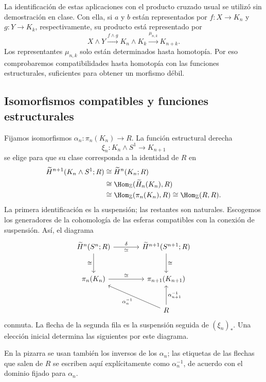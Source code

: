 La identificación de estas aplicaciones con el producto cruzado usual se utilizó sin demostración en clase. Con ella, si $a$ y $b$ están representados por $f\colon X\to K_n$ y $g\colon Y\to K_k$, respectivamente, su producto está representado por
\[
X\wedge Y\xrightarrow{f\wedge g}K_n\wedge K_k
\xrightarrow{\mu_{n,k}}K_{n+k}.
\]
Los representantes $\mu_{n,k}$ solo están determinados hasta homotopía. Por eso comprobaremos compatibilidades hasta homotopía con las funciones estructurales, suficientes para obtener un morfismo débil.

\subsection{Isomorfismos compatibles y funciones estructurales}
Fijamos isomorfismos $\alpha_n\colon\pi_n(K_n)\to R$. La función estructural derecha
\[
\xi_n\colon K_n\wedge S^1\longrightarrow K_{n+1}
\]
se elige para que su clase corresponda a la identidad de $R$ en
\[
\begin{aligned}
\widetilde H^{n+1}(K_n\wedge S^1;R)
&\cong\widetilde H^n(K_n;R)\\
&\cong\Hom_{\mathbb Z}(\widetilde H_n(K_n),R)\\
&\cong\Hom_{\mathbb Z}(\pi_n(K_n),R)
\cong\Hom_{\mathbb Z}(R,R).
\end{aligned}
\]
La primera identificación es la suspensión; las restantes son naturales. Escogemos los generadores de la cohomología de las esferas compatibles con la conexión de suspensión. Así, el diagrama
\[
\begin{tikzcd}[column sep=large,row sep=large]
\widetilde H^n(S^n;R)\arrow[r,"\delta","\simeq"']\arrow[d,"\cong"']&
\widetilde H^{n+1}(S^{n+1};R)\arrow[d,"\cong"]\\
\pi_n(K_n)\arrow[r,"\cong"]&\pi_{n+1}(K_{n+1})\\
&R\arrow[ul,"\alpha_n^{-1}"]\arrow[u,"\alpha_{n+1}^{-1}"']
\end{tikzcd}
\]
conmuta. La flecha de la segunda fila es la suspensión seguida de $(\xi_n)_*$. Una elección inicial determina las siguientes por este diagrama.

En la pizarra se usan también los inversos de los $\alpha_n$; las etiquetas de las flechas que salen de $R$ se escriben aquí explícitamente como $\alpha_n^{-1}$, de acuerdo con el dominio fijado para $\alpha_n$.

